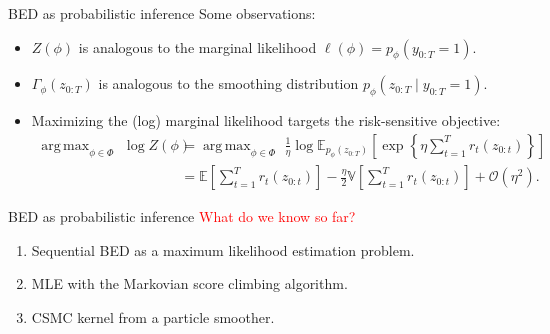 \documentclass[10pt, aspectratio=1610]{beamer}
\DeclareMathOperator*{\argmax}{arg\,max}
\begin{document}
    \begin{frame}{BED as probabilistic inference}
      Some observations:\vspace{0.1cm}
      \begin{itemize}
        \setlength\itemsep{1em}
        \item $Z(\phi)$ is analogous to the marginal likelihood $\ell(\phi) = p_\phi(y_{0:T} = 1)$.
        \item $\Gamma_\phi(z_{0:T})$ is analogous to the smoothing distribution $p_\phi(z_{0:T} \mid y_{0:T} = 1)$.
        \item Maximizing the (log) marginal likelihood targets the risk-sensitive objective:
          \begin{align}
            \argmax_{\phi \in \Phi} \,\, \log Z(\phi) &= \argmax_{\phi \in \Phi} \,\, \frac{1}{\eta} \log \mathbb{E}_{p_\phi(z_{0:T})} \left[\exp \left\{\eta \sum_{t=1}^T r_t(z_{0:t})\right\}\right] \\
            &= \mathbb{E} \left[\sum_{t=1}^T r_t(z_{0:t})\right] - \frac{\eta}{2} \mathbb{V} \left[ \sum_{t=1}^T r_t(z_{0:t}) \right] + \mathcal{O}(\eta^2).
          \end{align}
      \end{itemize}
    \end{frame}

    \begin{frame}{BED as probabilistic inference}
      \textcolor{red}{\large What do we know so far?}\vspace{0.2cm}
      \begin{enumerate}
        \setlength\itemsep{1.5em}
        \item<2-> Sequential BED as a maximum likelihood estimation problem.
        \item<3-> MLE with the Markovian score climbing algorithm.
        \item<4-> CSMC kernel from a particle smoother.
      \end{enumerate}

      \vspace{0.3cm}
    \end{frame}
\end{document}
